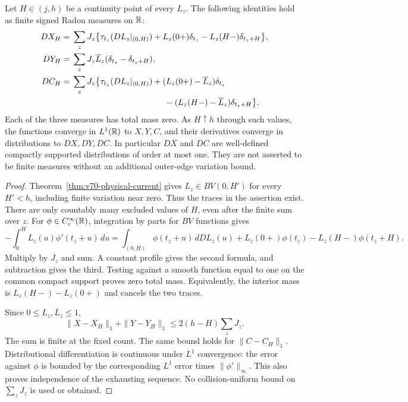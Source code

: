 \begin{theorem}
\label{thm:v72-window-current}
Let $H\in(j,h)$ be a continuity point of every $L_z$. The following
identities hold as finite signed Radon measures on $\mathbb R$:
\begin{align}
 D X_H={}&\sum_zJ_z\bigl\{
  \tau_{t_z}(DL_z|_{(0,H)})
       +L_z(0+)\delta_{t_z}-L_z(H-)\delta_{t_z+H}\bigr\},
                                  \label{eq:v72-DXH}\\
 D Y_H={}&\sum_zJ_z\overline L_z
                         (\delta_{t_z}-\delta_{t_z+H}),
                                  \label{eq:v72-DYH}\\
 D C_H={}&\sum_zJ_z\bigl\{
  \tau_{t_z}(DL_z|_{(0,H)})
       +(L_z(0+)-\overline L_z)\delta_{t_z}\notag\\
 &\hspace{39mm}-(L_z(H-)-\overline L_z)\delta_{t_z+H}\bigr\}.
                                  \label{eq:v72-DCH}
\end{align}
Each of the three measures has total mass zero. As $H\uparrow h$
through such values, the functions converge in $L^1(\mathbb R)$ to $X,Y,C$,
and their derivatives converge in distributions to $DX,DY,DC$.
In particular $DX$ and $DC$ are well-defined compactly supported
distributions of order at most one. They are not asserted to be
finite measures without an additional outer-edge variation bound.
\end{theorem}
\begin{proof}
Theorem~\ref{thm:v70-physical-current} gives $L_z\in BV(0,H')$
for every $H'<h$, including finite variation near zero. Thus the
traces in the assertion exist. There are only countably many
excluded values of $H$, even after the finite sum over $z$.
For $\phi\in C_c^\infty(\mathbb R)$, integration by parts for $BV$
functions gives
\[
 -\int_0^H L_z(u)\phi'(t_z+u)\,du
 =\int_{(0,H)}\phi(t_z+u)\,dDL_z(u)
  +L_z(0+)\phi(t_z)-L_z(H-)\phi(t_z+H).
\]
Multiply by $J_z$ and sum. A constant profile gives the second
formula, and subtraction gives the third. Testing against a smooth
function equal to one on the common compact support proves zero
total mass. Equivalently, the interior mass is
$L_z(H-)-L_z(0+)$ and cancels the two traces.

Since $0\le L_z,\overline L_z\le1$,
\[
 \|X-X_H\|_1+\|Y-Y_H\|_1
                  \le2(h-H)\sum_zJ_z.
\]
The sum is finite at the fixed count. The same bound holds for
$\|C-C_H\|_1$. Distributional differentiation is continuous under
$L^1$ convergence: the error against $\phi$ is bounded by the
corresponding $L^1$ error times $\|\phi'\|_\infty$. This also
proves independence of the exhausting sequence. No collision-uniform
bound on $\sum_zJ_z$ is used or obtained.
\end{proof}

